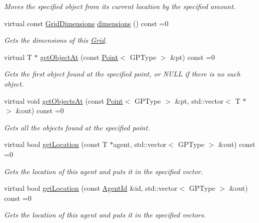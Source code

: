 \begin{DoxyCompactItemize}
\begin{DoxyCompactList}\small\item\em Moves the specified object from its current location by the specified amount. \end{DoxyCompactList}\item 
virtual const \hyperlink{classrepast_1_1_grid_dimensions}{Grid\-Dimensions} \hyperlink{classrepast_1_1_grid_ac6a979a6491565212ae44b8bfbbc9393}{dimensions} () const =0
\begin{DoxyCompactList}\small\item\em Gets the dimensions of this \hyperlink{classrepast_1_1_grid}{Grid}. \end{DoxyCompactList}\item 
virtual T $\ast$ \hyperlink{classrepast_1_1_grid_a8b77b072353aed6f06b6d02e21ee9879}{get\-Object\-At} (const \hyperlink{classrepast_1_1_point}{Point}$<$ G\-P\-Type $>$ \&pt) const =0
\begin{DoxyCompactList}\small\item\em Gets the first object found at the specified point, or N\-U\-L\-L if there is no such object. \end{DoxyCompactList}\item 
virtual void \hyperlink{classrepast_1_1_grid_aaa3a1fd92707079f7dd4805e36ca83ff}{get\-Objects\-At} (const \hyperlink{classrepast_1_1_point}{Point}$<$ G\-P\-Type $>$ \&pt, std\-::vector$<$ T $\ast$ $>$ \&out) const =0
\begin{DoxyCompactList}\small\item\em Gets all the objects found at the specified point. \end{DoxyCompactList}\item 
virtual bool \hyperlink{classrepast_1_1_grid_a159a33da91ef58dbd8ca88829d82ca36}{get\-Location} (const T $\ast$agent, std\-::vector$<$ G\-P\-Type $>$ \&out) const =0
\begin{DoxyCompactList}\small\item\em Gets the location of this agent and puts it in the specified vector. \end{DoxyCompactList}\item 
virtual bool \hyperlink{classrepast_1_1_grid_a6fef590f66b69e4a06207df59d1b2737}{get\-Location} (const \hyperlink{classrepast_1_1_agent_id}{Agent\-Id} \&id, std\-::vector$<$ G\-P\-Type $>$ \&out) const =0
\begin{DoxyCompactList}\small\item\em Gets the location of this agent and puts it in the specified vectors. \end{DoxyCompactList}\item 

\end{DoxyCompactItemize}
